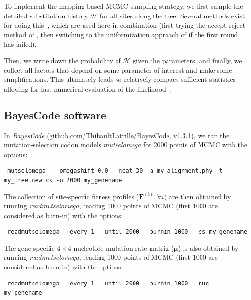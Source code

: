 \documentclass{article}
\newcommand{\UniDimArray}[1]{\bm{#1}}
\newcommand{\subhistory}{\mathcal{H}}
\begin{document}
    To implement the mapping-based {MCMC} sampling strategy, we first sample the detailed {substitution} history $\subhistory$ for all sites along the tree.
    Several methods exist for doing this~\cite{nielsen_mapping_2002,rodrigue_uniformization_2008}, which are used here in combination (first trying the accept-reject method of \textcite{nielsen_mapping_2002}, then switching to the uniformization approach of \textcite{rodrigue_uniformization_2008} if the first round has failed).

    Then, we write down the probability of $\subhistory$ given the parameters, and finally, we collect all factors that depend on some parameter of interest and make some simplifications.
    This ultimately leads to relatively compact sufficient statistics allowing for fast numerical evaluation of the likelihood~\cite{irvahn_phylogenetic_2014,davydov_state_2017}.

    \subsection{BayesCode software}\label{subsec:bayescode}
    In \textit{BayesCode} (\href{https://github.com/ThibaultLatrille/BayesCode}{github.com/ThibaultLatrille/BayesCode}, v1.3.1), we ran the mutation-selection codon models \textit{mutselomega} for 2000 points of MCMC with the options:
    \begin{scriptsize}
        \begin{verbatim}
 mutselomega ---omegashift 0.0 --ncat 30 -a my_alignment.phy -t my_tree.newick -u 2000 my_genename
        \end{verbatim}
    \end{scriptsize}
    The collection of site-specific fitness profiles ($\UniDimArray{F^{(i)}}, \forall i$) are then obtained by running \textit{readmutselomega}, reading 1000 points of MCMC (first 1000 are considered as burn-in) with the options:
    \begin{scriptsize}
        \begin{verbatim}
 readmutselomega --every 1 --until 2000 --burnin 1000 --ss my_genename
        \end{verbatim}
    \end{scriptsize}
    The gene-specific $4 \times 4$ nucleotide mutation rate matrix ($\UniDimArray{\mu}$) is also obtained by running \textit{readmutselomega}, reading 1000 points of MCMC (first 1000 are considered as burn-in) with the options:
    \begin{scriptsize}
        \begin{verbatim}
 readmutselomega --every 1 --until 2000 --burnin 1000 --nuc my_genename
        \end{verbatim}
    \end{scriptsize}
\end{document}
